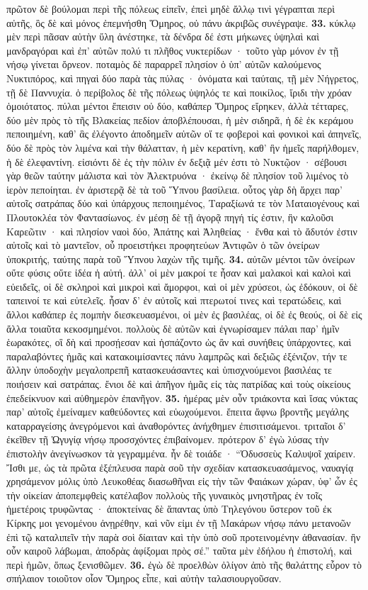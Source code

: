 \documentclass[a4paper, 11pt, oneside, polutonikogreek, german]{article}
\begin{document}
πρῶτον δὲ βούλομαι περὶ τῆς πόλεως εἰπεῖν, ἐπεὶ μηδὲ ἄλλῳ τινὶ γέγραπται περὶ αὐτῆς, ὃς δὲ καὶ μόνος ἐπεμνήσθη Ὅμηρος, οὐ πάνυ ἀκριβῶς συνέγραψε. \textbf{33.} κύκλῳ μὲν περὶ πᾶσαν αὐτὴν ὕλη ἀνέστηκε, τὰ δένδρα δέ ἐστι μήκωνες ὑψηλαὶ καὶ μανδραγόραι καὶ ἐπ' αὐτῶν πολύ τι πλῆθος νυκτερίδων · τοῦτο γὰρ μόνον ἐν τῇ νήσῳ γίνεται ὄρνεον. ποταμὸς δὲ παραρρεῖ πλησίον ὁ ὑπ' αὐτῶν καλούμενος Νυκτιπόρος, καὶ πηγαὶ δύο παρὰ τὰς πύλας · ὀνόματα καὶ ταύταις, τῇ μὲν Νήγρετος, τῇ δὲ Παννυχία. ὁ περίβολος δὲ τῆς πόλεως ὑψηλός τε καὶ ποικίλος, ἴριδι τὴν χρόαν ὁμοιότατος. πύλαι μέντοι ἔπεισιν οὐ δύο, καθάπερ Ὅμηρος εἴρηκεν, ἀλλὰ τέτταρες, δύο μὲν πρὸς τὸ τῆς Βλακείας πεδίον ἀποβλέπουσαι, ἡ μὲν σιδηρᾶ, ἡ δὲ ἐκ κεράμου πεποιημένη, καθ' ἃς ἐλέγοντο ἀποδημεῖν αὐτῶν οἵ τε φοβεροὶ καὶ φονικοὶ καὶ ἀπηνεῖς, δύο δὲ πρὸς τὸν λιμένα καὶ τὴν θάλατταν, ἡ μὲν κερατίνη, καθ' ἣν ἡμεῖς παρήλθομεν, ἡ δὲ ἐλεφαντίνη. εἰσιόντι δὲ ἐς τὴν πόλιν ἐν δεξιᾷ μέν ἐστι τὸ Νυκτῷον · σέβουσι γὰρ θεῶν ταύτην μάλιστα καὶ τὸν Ἀλεκτρυόνα · ἐκείνῳ δὲ πλησίον τοῦ λιμένος τὸ ἱερὸν πεποίηται. ἐν ἀριστερᾷ δὲ τὰ τοῦ Ὕπνου βασίλεια. οὗτος γὰρ δὴ ἄρχει παρ' αὐτοῖς σατράπας δύο καὶ ὑπάρχους πεποιημένος, Ταραξίωνά τε τὸν Ματαιογένους καὶ Πλουτοκλέα τὸν Φαντασίωνος. ἐν μέσῃ δὲ τῇ ἀγορᾷ πηγή τίς ἐστιν, ἣν καλοῦσι Καρεῶτιν · καὶ πλησίον ναοὶ δύο, Ἀπάτης καὶ Ἀληθείας · ἔνθα καὶ τὸ ἄδυτόν ἐστιν αὐτοῖς καὶ τὸ μαντεῖον, οὗ προειστήκει προφητεύων Ἀντιφῶν ὁ τῶν ὀνείρων ὑποκριτής, ταύτης παρὰ τοῦ Ὕπνου λαχὼν τῆς τιμῆς. \textbf{34.} αὐτῶν μέντοι τῶν ὀνείρων οὔτε φύσις οὔτε ἰδέα ἡ αὐτή. ἀλλ' οἱ μὲν μακροί τε ἦσαν καὶ μαλακοὶ καὶ καλοὶ καὶ εὐειδεῖς, οἱ δὲ σκληροὶ καὶ μικροὶ καὶ ἄμορφοι, καὶ οἱ μὲν χρύσεοι, ὡς ἐδόκουν, οἱ δὲ ταπεινοί τε καὶ εὐτελεῖς. ἦσαν δ' ἐν αὐτοῖς καὶ πτερωτοί τινες καὶ τερατώδεις, καὶ ἄλλοι καθάπερ ἐς πομπὴν διεσκευασμένοι, οἱ μὲν ἐς βασιλέας, οἱ δὲ ἐς θεούς, οἱ δὲ εἰς ἄλλα τοιαῦτα κεκοσμημένοι. πολλοὺς δὲ αὐτῶν καὶ ἐγνωρίσαμεν πάλαι παρ' ἡμῖν ἑωρακότες, οἳ δὴ καὶ προσῄεσαν καὶ ἠσπάζοντο ὡς ἂν καὶ συνήθεις ὑπάρχοντες, καὶ παραλαβόντες ἡμᾶς καὶ κατακοιμίσαντες πάνυ λαμπρῶς καὶ δεξιῶς ἐξένιζον, τήν τε ἄλλην ὑποδοχὴν μεγαλοπρεπῆ κατασκευάσαντες καὶ ὑπισχνούμενοι βασιλέας τε ποιήσειν καὶ σατράπας. ἔνιοι δὲ καὶ ἀπῆγον ἡμᾶς εἰς τὰς πατρίδας καὶ τοὺς οἰκείους ἐπεδείκνυον καὶ αὐθημερὸν ἐπανῆγον. \textbf{35.} ἡμέρας μὲν οὖν τριάκοντα καὶ ἴσας νύκτας παρ' αὐτοῖς ἐμείναμεν καθεύδοντες καὶ εὐωχούμενοι. ἔπειτα ἄφνω βροντῆς μεγάλης καταρραγείσης ἀνεγρόμενοι καὶ ἀναθορόντες ἀνήχθημεν ἐπισιτισάμενοι. τριταῖοι δ' ἐκεῖθεν τῇ Ὠγυγίᾳ νήσῳ προσσχόντες ἐπιβαίνομεν. πρότερον δ' ἐγὼ λύσας τὴν ἐπιστολὴν ἀνεγίνωσκον τὰ γεγραμμένα. ἦν δὲ τοιάδε · "`Ὀδυσσεὺς Καλυψοῖ χαίρειν. Ἴσθι με, ὡς τὰ πρῶτα ἐξέπλευσα παρὰ σοῦ τὴν σχεδίαν κατασκευασάμενος, ναυαγίᾳ χρησάμενον μόλις ὑπὸ Λευκοθέας διασωθῆναι εἰς τὴν τῶν Φαιάκων χώραν, ὑφ' ὧν ἐς τὴν οἰκείαν ἀποπεμφθεὶς κατέλαβον πολλοὺς τῆς γυναικὸς μνηστῆρας ἐν τοῖς ἡμετέροις τρυφῶντας · ἀποκτείνας δὲ ἅπαντας ὑπὸ Τηλεγόνου ὕστερον τοῦ ἐκ Κίρκης μοι γενομένου ἀνῃρέθην, καὶ νῦν εἰμι ἐν τῇ Μακάρων νήσῳ πάνυ μετανοῶν ἐπὶ τῷ καταλιπεῖν τὴν παρὰ σοὶ δίαιταν καὶ τὴν ὑπὸ σοῦ προτεινομένην ἀθανασίαν. ἢν οὖν καιροῦ λάβωμαι, ἀποδρὰς ἀφίξομαι πρὸς σέ."' ταῦτα μὲν ἐδήλου ἡ ἐπιστολή, καὶ περὶ ἡμῶν, ὅπως ξενισθῶμεν. \textbf{36.} ἐγὼ δὲ προελθὼν ὀλίγον ἀπὸ τῆς θαλάττης εὗρον τὸ σπήλαιον τοιοῦτον οἷον Ὅμηρος εἶπε, καὶ αὐτὴν ταλασιουργοῦσαν. 
\end{document}
